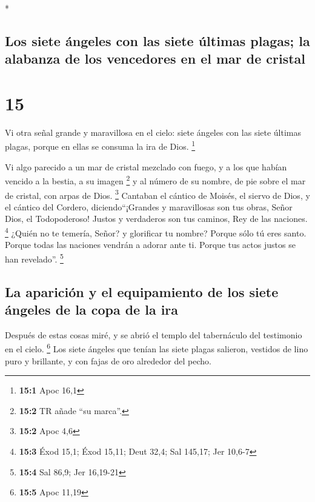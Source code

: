 \begin{paracol}{2}
\begin{otherlanguage}{english}
\end{otherlanguage}

\switchcolumn[0]*

\hypertarget{los-siete-uxe1ngeles-con-las-siete-uxfaltimas-plagas-la-alabanza-de-los-vencedores-en-el-mar-de-cristal}{%
\subsection{Los siete ángeles con las siete últimas plagas; la alabanza
de los vencedores en el mar de
cristal}\label{los-siete-uxe1ngeles-con-las-siete-uxfaltimas-plagas-la-alabanza-de-los-vencedores-en-el-mar-de-cristal}}

\hypertarget{section-28}{%
\section{15}\label{section-28}}

 Vi otra señal grande y maravillosa en el cielo: siete
ángeles con las siete últimas plagas, porque en ellas se consuma la ira
de Dios. \footnote{\textbf{15:1} Apoc 16,1}

 Vi algo parecido a un mar de cristal mezclado con fuego,
y a los que habían vencido a la bestia, a su imagen \footnote{\textbf{15:2}
  TR añade ``su marca''.} y al número de su nombre, de pie sobre el mar
de cristal, con arpas de Dios. \footnote{\textbf{15:2} Apoc 4,6}
 Cantaban el cántico de Moisés, el siervo de Dios, y el
cántico del Cordero, diciendo``¡Grandes y maravillosas son tus obras,
Señor Dios, el Todopoderoso! Justos y verdaderos son tus caminos, Rey de
las naciones. \footnote{\textbf{15:3} Éxod 15,1; Éxod 15,11; Deut 32,4;
  Sal 145,17; Jer 10,6-7}  ¿Quién no te temería, Señor? y
glorificar tu nombre? Porque sólo tú eres santo. Porque todas las
naciones vendrán a adorar ante ti. Porque tus actos justos se han
revelado''. \footnote{\textbf{15:4} Sal 86,9; Jer 16,19-21}

\hypertarget{la-apariciuxf3n-y-el-equipamiento-de-los-siete-uxe1ngeles-de-la-copa-de-la-ira}{%
\subsection{La aparición y el equipamiento de los siete ángeles de la
copa de la
ira}\label{la-apariciuxf3n-y-el-equipamiento-de-los-siete-uxe1ngeles-de-la-copa-de-la-ira}}

 Después de estas cosas miré, y se abrió el templo del
tabernáculo del testimonio en el cielo. \footnote{\textbf{15:5} Apoc
  11,19}  Los siete ángeles que tenían las siete plagas
salieron, vestidos de lino puro y brillante, y con fajas de oro
alrededor del pecho.


\end{paracol}
